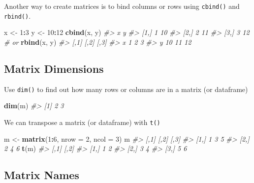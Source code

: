 \documentclass[]{book}
\newenvironment{Shaded}{\begin{snugshade}}{\end{snugshade}}
\newcommand{\KeywordTok}[1]{\textcolor[rgb]{0.13,0.29,0.53}{\textbf{#1}}}
\newcommand{\DataTypeTok}[1]{\textcolor[rgb]{0.13,0.29,0.53}{#1}}
\newcommand{\DecValTok}[1]{\textcolor[rgb]{0.00,0.00,0.81}{#1}}
\newcommand{\StringTok}[1]{\textcolor[rgb]{0.31,0.60,0.02}{#1}}
\newcommand{\CommentTok}[1]{\textcolor[rgb]{0.56,0.35,0.01}{\textit{#1}}}
\newcommand{\OperatorTok}[1]{\textcolor[rgb]{0.81,0.36,0.00}{\textbf{#1}}}
\newcommand{\NormalTok}[1]{#1}
\begin{document}
Another way to create matrices is to bind columns or rows using
\texttt{cbind()} and \texttt{rbind()}.

\begin{Shaded}
\begin{Highlighting}[]
\NormalTok{x <-}\StringTok{ }\DecValTok{1}\OperatorTok{:}\DecValTok{3}
\NormalTok{y <-}\StringTok{ }\DecValTok{10}\OperatorTok{:}\DecValTok{12}
\KeywordTok{cbind}\NormalTok{(x, y)}
\CommentTok{#>      x  y}
\CommentTok{#> [1,] 1 10}
\CommentTok{#> [2,] 2 11}
\CommentTok{#> [3,] 3 12}
\CommentTok{# or }
\KeywordTok{rbind}\NormalTok{(x, y)}
\CommentTok{#>   [,1] [,2] [,3]}
\CommentTok{#> x    1    2    3}
\CommentTok{#> y   10   11   12}
\end{Highlighting}
\end{Shaded}

\subsection{Matrix Dimensions}\label{matrix-dimensions}

Use \texttt{dim()} to find out how many rows or columns are in a matrix
(or dataframe)

\begin{Shaded}
\begin{Highlighting}[]
\KeywordTok{dim}\NormalTok{(m)}
\CommentTok{#> [1] 2 3}
\end{Highlighting}
\end{Shaded}

We can transpose a matrix (or dataframe) with \texttt{t()}

\begin{Shaded}
\begin{Highlighting}[]
\NormalTok{m <-}\StringTok{ }\KeywordTok{matrix}\NormalTok{(}\DecValTok{1}\OperatorTok{:}\DecValTok{6}\NormalTok{, }\DataTypeTok{nrow =} \DecValTok{2}\NormalTok{, }\DataTypeTok{ncol =} \DecValTok{3}\NormalTok{)}
\NormalTok{m}
\CommentTok{#>      [,1] [,2] [,3]}
\CommentTok{#> [1,]    1    3    5}
\CommentTok{#> [2,]    2    4    6}
\KeywordTok{t}\NormalTok{(m)}
\CommentTok{#>      [,1] [,2]}
\CommentTok{#> [1,]    1    2}
\CommentTok{#> [2,]    3    4}
\CommentTok{#> [3,]    5    6}
\end{Highlighting}
\end{Shaded}

\subsection{Matrix Names}\label{matrix-names}
\end{document}
